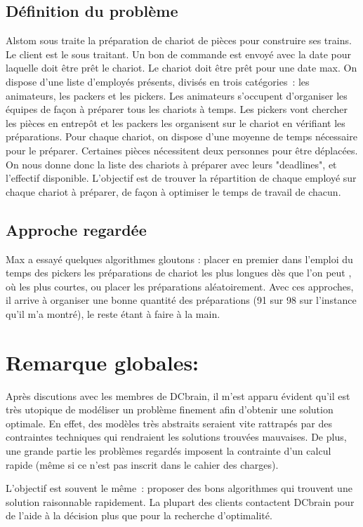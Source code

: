 \documentclass{article}
\begin{document}
\subsection{Définition du problème}
Alstom sous traite la préparation de chariot de pièces pour construire ses trains. Le client est le sous traitant.
Un bon de commande est envoyé avec la date pour laquelle doit être prêt le chariot. Le chariot doit être prêt pour une date max. On dispose d'une liste d'employés présents, divisés en trois catégories : les animateurs, les packers et les pickers. Les animateurs s'occupent d'organiser les équipes de façon à préparer tous les chariots à temps. Les pickers vont chercher les pièces en entrepôt et les packers les organisent sur le chariot en vérifiant les préparations. 
Pour chaque chariot, on dispose d'une moyenne de temps nécessaire pour le préparer. Certaines pièces nécessitent deux personnes pour être déplacées.
On nous donne donc la liste des chariots à préparer avec leurs "deadlines", et l'effectif disponible.
L'objectif est de trouver la répartition de chaque employé sur chaque chariot à préparer, de façon à optimiser le temps de travail de chacun.

\subsection{Approche regardée}
Max a essayé quelques algorithmes gloutons : placer en premier dans l'emploi du temps des pickers les préparations de chariot les plus longues dès que l'on peut , où les plus courtes, ou placer les préparations aléatoirement. Avec ces approches, il arrive à organiser une bonne quantité des préparations (91 sur 98 sur l'instance qu'il m'a montré), le reste étant à faire à la main.



\section{Remarque globales:}
Après discutions avec les membres de DCbrain, il m'est apparu évident qu'il est très utopique de modéliser un problème finement afin d'obtenir une solution optimale. En effet, des modèles très abstraits seraient vite rattrapés par des contraintes techniques qui rendraient les solutions trouvées mauvaises. De plus, une grande partie les problèmes regardés imposent la contrainte d'un calcul rapide (même si ce n'est pas inscrit dans le cahier des charges).

L'objectif est souvent le même : proposer des bons algorithmes qui trouvent une solution raisonnable rapidement. La plupart des clients contactent DCbrain pour de l'aide à la décision plus que pour la recherche d'optimalité.

%
%
\end{document}
